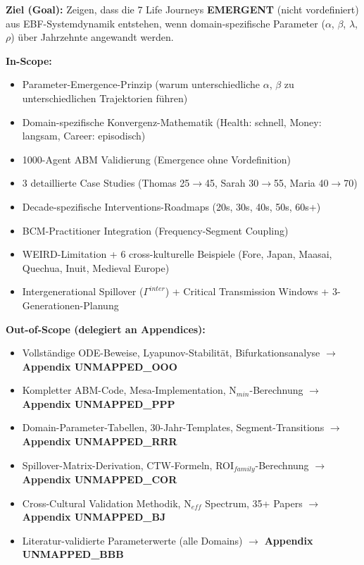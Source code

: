 \begin{tcolorbox}[colback=purple!5!white, colframe=purple!75!black, title=Chapter Scope: Ziel / In-Scope / Out-of-Scope / Lieferobjekte]

\textbf{Ziel (Goal):}
Zeigen, dass die 7 Life Journeys \textbf{EMERGENT} (nicht vordefiniert) aus EBF-Systemdynamik entstehen, wenn domain-spezifische Parameter ($\alpha$, $\beta$, $\lambda$, $\rho$) über Jahrzehnte angewandt werden.

\vspace{0.3cm}
\textbf{In-Scope:}
\begin{itemize}[nosep]
\item Parameter-Emergence-Prinzip (warum unterschiedliche $\alpha$, $\beta$ zu unterschiedlichen Trajektorien führen)
\item Domain-spezifische Konvergenz-Mathematik (Health: schnell, Money: langsam, Career: episodisch)
\item 1000-Agent ABM Validierung (Emergence ohne Vordefinition)
\item 3 detaillierte Case Studies (Thomas 25$\to$45, Sarah 30$\to$55, Maria 40$\to$70)
\item Decade-spezifische Interventions-Roadmaps (20s, 30s, 40s, 50s, 60s+)
\item BCM-Practitioner Integration (Frequency-Segment Coupling)
\item WEIRD-Limitation + 6 cross-kulturelle Beispiele (Fore, Japan, Maasai, Quechua, Inuit, Medieval Europe)
\item Intergenerational Spillover ($\Gamma^{inter}$) + Critical Transmission Windows + 3-Generationen-Planung
\end{itemize}

\vspace{0.3cm}
\textbf{Out-of-Scope (delegiert an Appendices):}
\begin{itemize}[nosep]
\item Vollständige ODE-Beweise, Lyapunov-Stabilität, Bifurkationsanalyse $\to$ \textbf{Appendix UNMAPPED_OOO}
\item Kompletter ABM-Code, Mesa-Implementation, N$_{min}$-Berechnung $\to$ \textbf{Appendix UNMAPPED_PPP}
\item Domain-Parameter-Tabellen, 30-Jahr-Templates, Segment-Transitions $\to$ \textbf{Appendix UNMAPPED_RRR}
\item Spillover-Matrix-Derivation, CTW-Formeln, ROI$_{family}$-Berechnung $\to$ \textbf{Appendix UNMAPPED_COR}
\item Cross-Cultural Validation Methodik, N$_{eff}$ Spectrum, 35+ Papers $\to$ \textbf{Appendix UNMAPPED_BJ}
\item Literatur-validierte Parameterwerte (alle Domains) $\to$ \textbf{Appendix UNMAPPED_BBB}
\end{itemize}


\end{tcolorbox}

